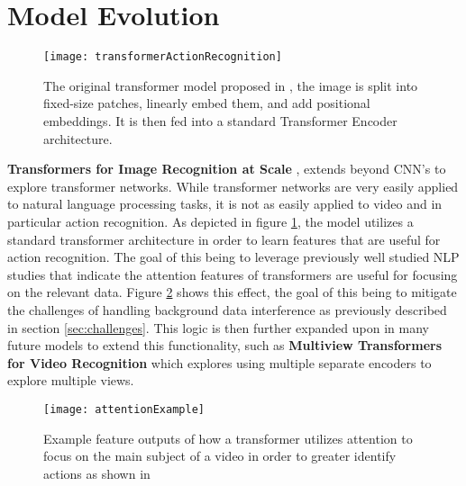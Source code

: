 \section{Model Evolution}

\begin{figure}[ht]
	\texttt{[image: transformerActionRecognition]}
	\centering
	\caption{The original transformer model proposed in \cite{transformer_og}, the image is split into fixed-size patches, linearly embed them, and add positional embeddings. It is then fed into a standard Transformer Encoder architecture.}
	\label{fig:transformerActionRecognition}
\end{figure}

\textbf{Transformers for Image Recognition at Scale} \cite{transformer_og}, extends beyond CNN's to explore transformer networks. While transformer networks are very easily applied to natural language processing tasks, it is not as easily applied to video and in particular action recognition. As depicted in figure \ref{fig:transformerActionRecognition}, the model utilizes a standard transformer architecture in order to learn features that are useful for action recognition. The goal of this being to leverage previously well studied NLP studies that indicate the attention features of transformers are useful for focusing on the relevant data. Figure \ref{fig:attentionExample} shows this effect, the goal of this being to mitigate the challenges of handling background data interference as previously described in section \ref{sec:challenges}. This logic is then further expanded upon in many future models to extend this functionality, such as \textbf{Multiview Transformers for Video Recognition} \cite{multiview_transformers} which explores using multiple separate encoders to explore multiple views.

\begin{figure}[ht]
	\texttt{[image: attentionExample]}
	\centering
	\caption{Example feature outputs of how a transformer utilizes attention to focus on the main subject of a video in order to greater identify actions as shown in \cite{transformer_og}}
	\label{fig:attentionExample}
\end{figure}

